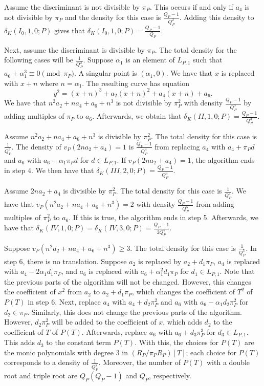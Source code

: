 \documentclass[12pt,letterpaper]{amsart}
\theoremstyle{definition}
\begin{document}
Assume the discriminant is not divisible by $\pi_P$. This occurs if and only if $a_4$ is not divisible by $\pi_P$ and the density for this case is $\frac{Q_P-1}{Q_P^2}$. Adding this density to $\delta_K(I_0,1,0;P)$ gives that $\delta_K(I_0,1,0;P)=\frac{Q_P-1}{Q_P}$.

Next, assume the discriminant is divisible by $\pi_P$. The total density for the following cases will be $\frac{1}{Q_P^2}$. Suppose $\alpha_1$ is an element of $L_{P, 1}$ such that $a_6+\alpha_1^3\equiv 0\pmod{\pi_P}$. A singular point is $(\alpha_1,0)$. We have that $x$ is replaced with $x+n$ where $n=\alpha_1$. The resulting curve has equation
\[
y^2=(x+n)^3+a_2(x+n)^2+a_4(x+n)+a_6.
\]
We have that $n^2a_2+n a_4+a_6+n^3$ is not divisible by $\pi_P^2$ with density $\frac{Q_P-1}{Q_P^3}$ by adding multiples of $\pi_P$ to $a_6$. Afterwards, we obtain that $\delta_K(II,1,0;P)=\frac{Q_P-1}{Q_P^3}$.

Assume $n^2a_2+n a_4+a_6+n^3$ is divisible by $\pi_P^2$. The total density for this case is $\frac{1}{Q_P^3}$. The density of $v_P(2n a_2+a_4)=1$ is $\frac{Q_P-1}{Q_P^4}$ from replacing $a_4$ with $a_4+\pi_Pd$ and $a_6$ with $a_6-\alpha_1\pi_Pd$ for $d\in L_{P,1}$. If $v_P(2na_2+a_4)=1$, the algorithm ends in step 4. We then have that $\delta_K(III,2,0;P)=\frac{Q_P-1}{Q_P^4}$.

Assume $2na_2+a_4$ is divisible by $\pi_P^2$. The total density for this case is $\frac{1}{Q_P^4}$. We have that $v_P(n^2 a_2+n a_4+a_6+n^3)=2$ with density $\frac{Q_P-1}{Q_P^5}$ from adding multiples of $\pi_P^2$ to $a_6$. If this is true, the algorithm ends in step 5. Afterwards, we have that $\delta_K(IV,1,0;P)=\delta_K(IV,3,0;P)=\frac{Q_P-1}{2Q_P^5}$.

Suppose $v_P(n^2 a_2+n a_4+a_6+n^3)\geq 3$. The total density for this case is $\frac{1}{Q_P^5}$. In step 6, there is no translation. Suppose $a_2$ is replaced by $a_2+d_1\pi_P$, $a_4$ is replaced with $a_4-2\alpha_1d_1\pi_P$, and $a_6$ is replaced with $a_6+\alpha_1^2d_1\pi_P$ for $d_1\in L_{P, 1}$. Note that the previous parts of the algorithm will not be changed. However, this changes the coefficient of $x^2$ from $a_2$ to $a_2+d_1\pi_P$, which changes the coefficient of $T^2$ of $P(T)$ in step 6. Next, replace $a_4$ with $a_4+d_2\pi_P^2$ and $a_6$ with $a_6-\alpha_1d_2\pi_P^2$ for $d_2\in \pi_P$. Similarly, this does not change the previous parts of the algorithm. However, $d_2\pi_P^2$  will be added to the coefficient of $x$, which adds $d_2$ to the coefficient of $T$ of $P(T)$. Afterwards, replace $a_6$ with $a_6+d_3\pi_P^3$ for $d_3\in L_{P, 1}$. This adds $d_3$ to the constant term $P(T)$. With this, the choices for $P(T)$ are the monic polynomials with degree $3$ in $(R_P/\pi_PR_P)[T]$; each choice for $P(T)$ corresponds to a density of $\frac{1}{Q_P^8}$. Moreover, the number of $P(T)$ with a double root and triple root are $Q_P(Q_P-1)$ and $Q_P$, respectively. 
\end{document}
